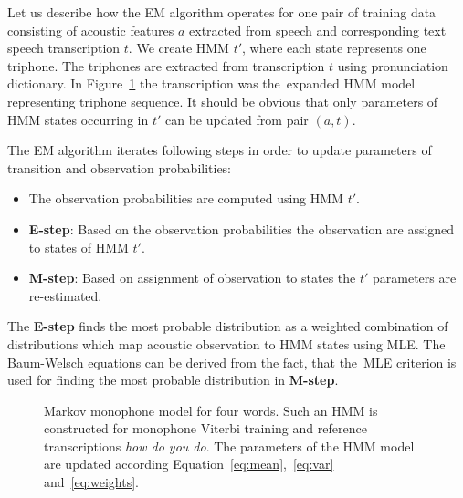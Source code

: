 {
Let us describe how the \ac{EM} algorithm operates for one pair
of training data consisting of acoustic features $a$ extracted from speech
and corresponding text speech transcription $t$.
We create \ac{HMM} $t'$, where each state represents one triphone. 
The triphones are extracted from transcription $t$ using pronunciation dictionary.
In Figure~\ref{fig:hmm_words} the transcription  
was the~expanded \ac{HMM} model representing triphone sequence.
It should be obvious that only parameters of HMM states 
occurring in $t'$ can be updated from pair $(a, t)$.

The \ac{EM} algorithm iterates following steps in order 
to update parameters of transition and observation probabilities:
\begin{itemize}
    \item The observation probabilities are computed using \ac{HMM} $t'$. 
    \item {\bf E-step}: Based on the observation probabilities the observation are assigned to states of \ac{HMM} $t'$. 
    \item {\bf M-step}: Based on assignment of observation to states the $t'$ parameters are re-estimated. 
\end{itemize}

The {\bf E-step} finds the most probable distribution as a weighted combination of distributions which map acoustic observation to \ac{HMM} states using \ac{MLE}\cite{gopinath1998maximum}.
The Baum-Welsch equations can be derived from the fact, that the~\ac{MLE} criterion is used for finding the most probable distribution in {\bf M-step}.\cite{huang2001spoken}

\begin{figure}[!htp]
    \begin{center}
    
    \caption{Markov monophone model for four words. Such an \ac{HMM} is constructed for monophone Viterbi training and reference transcriptions \textit{how do you do}. The parameters of the \ac{HMM} model are updated according Equation~\ref{eq:mean},~\ref{eq:var} and~\ref{eq:weights}.}
    \label{fig:hmm_words} 
    \end{center}
\end{figure}

}
